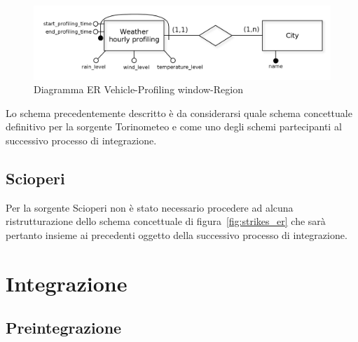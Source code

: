 \begin{figure}[H]                                                                                                                                                            
\centering                                                                                                                                                                   
\includegraphics[width=\textwidth]{diagrams/wheathre_hourly_profiling_er}                                                                                                                                   
\caption{Diagramma ER Vehicle-Profiling window-Region}                                                                                                                                            
\label{fig:wheathre_hourly_profiling_er}                                                                                                                                                           
\end{figure}

Lo schema precedentemente descritto è da considerarsi quale schema concettuale definitivo
per la sorgente Torinometeo e come uno degli schemi partecipanti al successivo processo di
integrazione.

\subsection{Scioperi}

Per la sorgente Scioperi non è stato necessario procedere ad alcuna ristrutturazione dello
schema concettuale di figura~\ref{fig:strikes_er} che sarà pertanto insieme ai precedenti
oggetto della successivo processo di integrazione.

\section{Integrazione}

\subsection{Preintegrazione}

